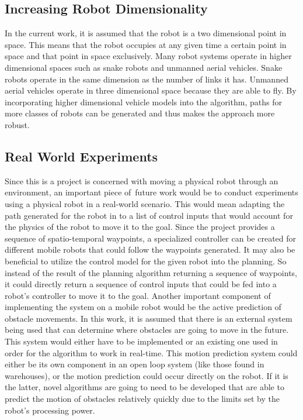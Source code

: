\subsection{Increasing Robot Dimensionality}

In the current work, it is assumed that the robot is a two dimensional point in
space. This means that the robot occupies at any given time a certain point in
space and that point in space exclusively. Many robot systems operate in higher
dimensional spaces such as snake robots and unmanned aerial vehicles. Snake
robots operate in the same dimension as the number of links it has. Unmanned
aerial vehicles operate in three dimensional space because they are able to
fly. By incorporating higher dimensional vehicle models into the algorithm,
paths for more classes of robots can be generated and thus makes the approach
more robust.

\subsection{Real World Experiments}

Since this is a project is concerned with moving a physical robot through an
environment, an important piece of\ future work would be to conduct experiments
using a physical robot in a real-world scenario. This would mean adapting the
path generated for the robot in to a list of control inputs that would account
for the physics of the robot to move it to the goal. Since the project provides
a sequence of spatio-temporal waypoints, a specialized controller can be
created for different mobile robots that could follow the waypoints generated.
It may also be beneficial to utilize the control model for the given robot into
the planning. So instead of the result of the planning algorithm returning a
sequence of waypoints, it could directly return a sequence of control inputs
that could be fed into a robot's controller to move it to the goal. Another
important component of implementing the system on a mobile robot would be the
active prediction of obstacle movements. In this work, it is assumed that there
is an external system being used that can determine where obstacles are going
to move in the future. This system would either have to be implemented or an
existing one used in order for the algorithm to work in real-time. This motion
prediction system could either be its own component in an open loop system
(like those found in warehouses), or the motion prediction could occur directly
on the robot. If it is the latter, novel algorithms are going to need to be
developed that are able to predict the motion of obstacles relatively quickly
due to the limits set by the robot's processing power.

